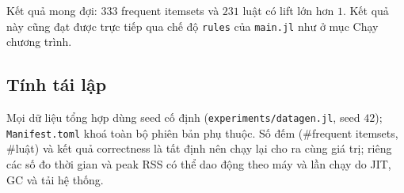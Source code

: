 Kết quả mong đợi: $333$ frequent itemsets và $231$ luật có lift lớn hơn $1$. Kết quả này cũng đạt được trực tiếp qua chế độ \texttt{rules} của \texttt{main.jl} như ở mục Chạy chương trình.

\subsection{Tính tái lập}

Mọi dữ liệu tổng hợp dùng seed cố định (\texttt{experiments/datagen.jl}, seed $42$); \texttt{Manifest.toml} khoá toàn bộ phiên bản phụ thuộc. Số đếm (\#frequent itemsets, \#luật) và kết quả correctness là tất định nên chạy lại cho ra cùng giá trị; riêng các số đo thời gian và peak RSS có thể dao động theo máy và lần chạy do JIT, GC và tải hệ thống.

